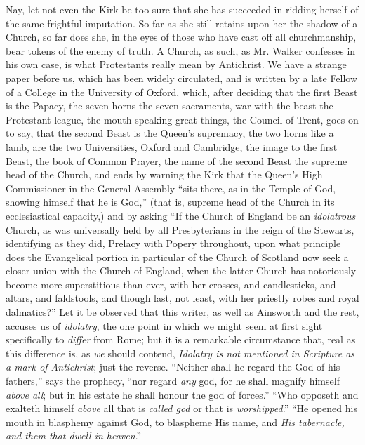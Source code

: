 Nay, let not even the Kirk be too sure that she has succeeded in
ridding herself of the same frightful imputation. So far as she still
retains upon her the shadow of a Church, so far does she, in the eyes
of those who have cast off all churchmanship, bear tokens of the enemy
of truth. A Church, as such, as Mr. Walker confesses in his own case,
is what Protestants really mean by Antichrist. We have a strange paper
before us, which has been widely circulated, and is written by a late
Fellow of a College in the University of Oxford, which, after deciding
that the first Beast is the Papacy, the seven horns the seven
sacraments, war with the beast the Protestant league, the mouth
speaking great things, the Council of Trent, goes on to say, that the
second Beast is the Queen's supremacy, the two horns like a lamb, are
the two Universities, Oxford and Cambridge, the image to the first
Beast, the book of Common Prayer, the name of the second Beast the
supreme head of the Church, and ends by warning the Kirk that the
Queen's High Commissioner in the General Assembly ``sits there, as
in the Temple of God, showing himself that he is God,'' (that is,
supreme head of the Church in its ecclesiastical capacity,) and by
asking ``If the Church of England be an \emph{idolatrous} Church,
as was universally held by all Presbyterians in the reign of the
Stewarts, identifying as they did, Prelacy with Popery throughout,
upon what principle does the Evangelical portion in particular
of the Church of Scotland now seek a closer union with the Church of
England, when the latter Church has notoriously become more
superstitious than ever, with her crosses, and candlesticks, and
altars, and faldstools, and though last, not least, with her priestly
robes and royal dalmatics?'' Let it be observed that this writer,
as well as Ainsworth and the rest, accuses us of \emph{idolatry}, the
one point in which we might seem at first sight specifically to \emph{differ}
from Rome; but it is a remarkable circumstance that, real as this
difference is, as \emph{we} should contend, \emph{Idolatry is not
mentioned in Scripture as a mark of Antichrist}; just the reverse.
``Neither shall he regard the God of his fathers,'' says the
prophecy, ``nor regard \emph{any} god, for he shall magnify himself \emph{above
all}; but in his estate he shall honour the god of forces.''
``Who opposeth and exalteth himself \emph{above} all that is \emph{called
god} or that is \emph{worshipped}.'' ``He opened his mouth
in blasphemy against God, to blaspheme His name, and \emph{His
tabernacle, and them that dwell in heaven}.''

